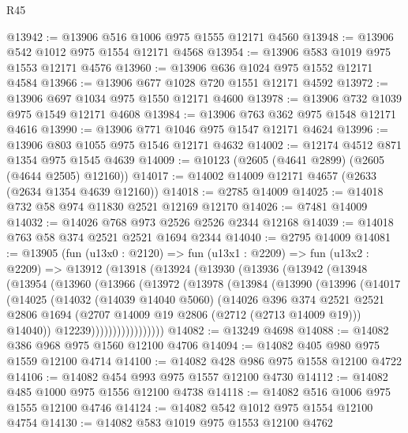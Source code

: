 \begin{lexlean}{R45}
\begin{coremodule}
@13942 := @13906 @516 @1006 @975 @1555 @12171 @4560
@13948 := @13906 @542 @1012 @975 @1554 @12171 @4568
@13954 := @13906 @583 @1019 @975 @1553 @12171 @4576
@13960 := @13906 @636 @1024 @975 @1552 @12171 @4584
@13966 := @13906 @677 @1028 @720 @1551 @12171 @4592
@13972 := @13906 @697 @1034 @975 @1550 @12171 @4600
@13978 := @13906 @732 @1039 @975 @1549 @12171 @4608
@13984 := @13906 @763 @362 @975 @1548 @12171 @4616
@13990 := @13906 @771 @1046 @975 @1547 @12171 @4624
@13996 := @13906 @803 @1055 @975 @1546 @12171 @4632
@14002 := @12174 @4512 @871 @1354 @975 @1545 @4639
@14009 := @10123 (@2605 (@4641 @2899) (@2605 (@4644 @2505) @12160))
@14017 := @14002 @14009 @12171 @4657 (@2633 (@2634 @1354 @4639 @12160))
@14018 := @2785 @14009
@14025 := @14018 @732 @58 @974 @11830 @2521 @12169 @12170
@14026 := @7481 @14009
@14032 := @14026 @768 @973 @2526 @2526 @2344 @12168
@14039 := @14018 @763 @58 @374 @2521 @2521 @1694 @2344
@14040 := @2795 @14009
@14081 := @13905
    (fun (u13x0 : @2120) =>
    fun (u13x1 : @2209) =>
    fun (u13x2 : @2209) =>
    @13912
      (@13918
        (@13924
          (@13930
            (@13936
              (@13942
                (@13948
                  (@13954
                    (@13960
                      (@13966
                        (@13972
                          (@13978
                            (@13984
                              (@13990
                                (@13996
                                  (@14017
                                    (@14025
                                      (@14032
                                        (@14039 @14040 @5060)
                                        (@14026
                                          @396
                                          @374
                                          @2521
                                          @2521
                                          @2806
                                          @1694
                                          (@2707 @14009 @19 @2806 (@2712 (@2713 @14009 @19)))
                                          @14040))
                                      @12239)))))))))))))))))
@14082 := @13249 @4698
@14088 := @14082 @386 @968 @975 @1560 @12100 @4706
@14094 := @14082 @405 @980 @975 @1559 @12100 @4714
@14100 := @14082 @428 @986 @975 @1558 @12100 @4722
@14106 := @14082 @454 @993 @975 @1557 @12100 @4730
@14112 := @14082 @485 @1000 @975 @1556 @12100 @4738
@14118 := @14082 @516 @1006 @975 @1555 @12100 @4746
@14124 := @14082 @542 @1012 @975 @1554 @12100 @4754
@14130 := @14082 @583 @1019 @975 @1553 @12100 @4762

\end{coremodule}
\end{lexlean}
